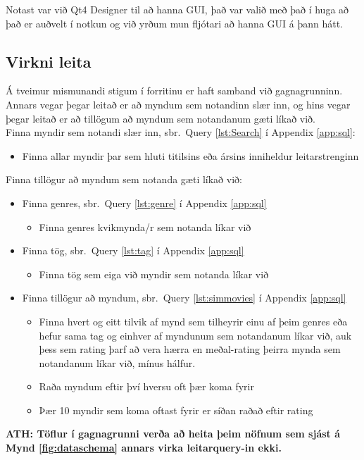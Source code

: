 \documentclass[12pt, git, final]{rureport}
\begin{document}
Notast var við Qt4 Designer \cite{qt4} til að hanna GUI, það var valið með það í huga að það er auðvelt í notkun og við yrðum mun fljótari að hanna GUI á þann hátt.

\subsection{Virkni leita}
Á tveimur mismunandi stigum í forritinu er haft samband við gagnagrunninn. Annars vegar þegar leitað er að myndum sem notandinn slær inn, og hins vegar þegar leitað er að tillögum að myndum sem notandanum gæti líkað við.
\\
Finna myndir sem notandi slær inn, sbr.~Query \ref{lst:Search} í Appendix \ref{app:sql}:
\begin{itemize}
	\item Finna allar myndir þar sem hluti titilsins eða ársins inniheldur leitarstrenginn
\end{itemize}
Finna tillögur að myndum sem notanda gæti líkað við:
\begin{itemize}
	\item Finna genres, sbr.~Query \ref{lst:genre} í Appendix \ref{app:sql}
	\begin{itemize}
		\item Finna genres kvikmynda/r sem notanda líkar við
	\end{itemize}
	\item Finna tög, sbr.~Query \ref{lst:tag} í Appendix \ref{app:sql}
	\begin{itemize}
		\item Finna tög sem eiga við myndir sem notanda líkar við
	\end{itemize}
	\item Finna tillögur að myndum, sbr.~Query \ref{lst:simmovies} í Appendix \ref{app:sql}
	\begin{itemize}
		\item Finna hvert og eitt tilvik af mynd sem tilheyrir einu af þeim genres eða hefur sama tag og einhver af myndunum sem notandanum líkar við, auk þess sem rating þarf að vera hærra en meðal-rating þeirra mynda sem notandanum líkar við, mínus hálfur.
		\item Raða myndum eftir því hversu oft þær koma fyrir
		\item Þær 10 myndir sem koma oftast fyrir er síðan raðað eftir rating
	\end{itemize}
\end{itemize}
\textbf{ATH: Töflur í gagnagrunni verða að heita þeim nöfnum sem sjást á Mynd \ref{fig:dataschema} annars virka leitarquery-in ekki.}
\end{document}
